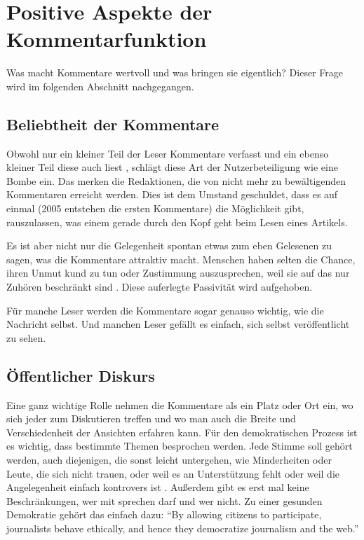 \chapter{Positive Aspekte der Kommentarfunktion}

Was macht Kommentare wertvoll und was bringen sie eigentlich? Dieser Frage wird
im folgenden Abschnitt nachgegangen.


\section{Beliebtheit der Kommentare}

Obwohl nur ein kleiner Teil der Leser Kommentare verfasst und ein ebenso kleiner
Teil diese auch liest \autocite[96ff]{reich}, schlägt diese Art der
Nutzerbeteiligung wie eine Bombe ein. Das merken die Redaktionen, die von nicht
mehr zu bewältigenden Kommentaren erreicht werden. Dies ist dem Umstand
geschuldet, dass es auf einmal (2005 entstehen die ersten Kommentare) die
Möglichkeit gibt, rauszulassen, was einem gerade durch den Kopf geht beim Lesen
eines Artikels.

Es ist aber nicht nur die Gelegenheit spontan etwas zum eben Gelesenen zu sagen,
was die Kommentare attraktiv macht. Menschen haben selten die Chance, ihren
Unmut kund zu tun oder Zustimmung auszusprechen, weil sie auf das nur Zuhören
beschränkt sind \autocite[S.~99]{reich}. Diese auferlegte Passivität wird
aufgehoben.

Für manche Leser werden die Kommentare sogar genauso wichtig, wie die Nachricht
selbst. Und manchen Leser gefällt es einfach, sich selbst veröffentlicht zu
sehen.


\section{Öffentlicher Diskurs}

Eine ganz wichtige Rolle nehmen die Kommentare als ein Platz oder Ort ein, wo
sich jeder zum Diskutieren treffen und wo man auch die Breite und
Verschiedenheit der Ansichten erfahren kann. Für den demokratischen Prozess ist
es wichtig, dass bestimmte Themen besprochen werden. Jede Stimme soll gehört
werden, auch diejenigen, die sonst leicht untergehen, wie Minderheiten oder
Leute, die sich nicht trauen, oder weil es an Unterstützung fehlt oder weil die
Angelegenheit einfach kontrovers ist \autocite[S.~12]{santana:2014}. Außerdem
gibt es erst mal keine Beschränkungen, wer mit sprechen darf und wer nicht.  Zu
einer gesunden Demokratie gehört das einfach dazu: ``By allowing citizens to
participate, journalists behave ethically, and hence they democratize journalism
and the web.'' \autocite[S.~125]{singer}

